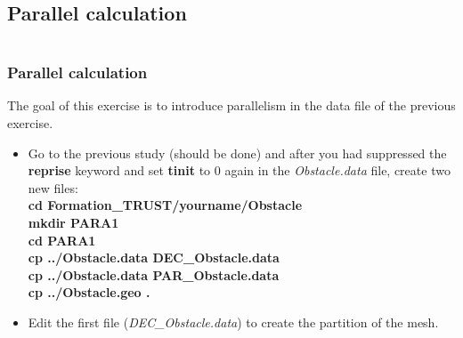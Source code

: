 \documentclass[10pt, hyperref={unicode=true,pdfusetitle, bookmarks=true,bookmarksnumbered=false,bookmarksopen=false, breaklinks=false,pdfborder={0 0l 1},backref=true,colorlinks=true,linkcolor=darkblue,pageanchor}]{beamer}
\begin{document}
\subsection{Parallel calculation} \label{exo_para_1}
\begin{frame}
\begin{small}
\begin{columns}[c] 
\tableofcontents[sections={1-8},currentsection, currentsubsection]
\tableofcontents[sections={9-16},currentsection, currentsubsection]
\end{columns}
\end{small}
\end{frame}
\begin{frame}
\frametitle{Parallel calculation}
\begin{block}{}

The goal of this exercise is to introduce parallelism in the data file of the previous exercise.

\begin{itemize}
\item Go to the previous study (should be done) and after you had suppressed the \textbf{reprise} keyword and set \textbf{tinit} to 0 again in the \textit{Obstacle.data} file, create two new files:\\
\textbf{cd Formation\_TRUST/yourname/Obstacle} \\
\textbf{mkdir PARA1} \\
\textbf{cd PARA1} \\
\textbf{cp ../Obstacle.data DEC\_Obstacle.data} \\
\textbf{cp ../Obstacle.data PAR\_Obstacle.data} \\
\textbf{cp ../Obstacle.geo .}\\
\vspace{0.3cm}
\item Edit the first file (\textit{DEC\_Obstacle.data}) to create the partition of the mesh.
\end{itemize}

\end{block}
\end{frame}
\end{document}
